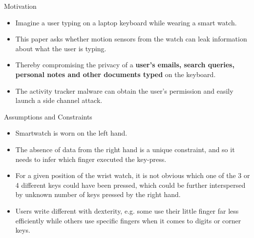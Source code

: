 \documentclass[ucs,9pt,usenames,dvipsnames]{beamer}
\begin{document}
\begin{frame}{Motivation}
 \begin{itemize}
 	\item Imagine a user typing on a laptop keyboard while wearing a 	smart watch. 
 	\item This paper asks whether motion sensors from the
 	watch can leak information about what the user is typing.
 	\item Thereby compromising the privacy of a
 	\textbf{user’s emails, search queries, personal notes and other documents typed} on the keyboard. 
 	
 	\item %
 	The activity tracker malware can obtain the	user’s permission and easily launch a side channel attack. 	
 \end{itemize}
\end{frame}

\begin{frame}{Assumptions and Constraints}
	\begin{itemize}
		\item Smartwatch is worn on the left hand.
		\item The absence of data from the right hand is a unique constraint, and so it needs to infer which finger	executed the key-press.
		\item For a given position of the wrist watch, it is not obvious which one of the 3 or 4 different keys could have been pressed, which could be further interspersed by unknown number of keys pressed by the right hand. 
		\item Users write different with dexterity, e.g. some use their little
		finger far less efficiently while others use specific fingers when
		it comes to digits or corner keys.
	\end{itemize}
\end{frame}
\end{document}
